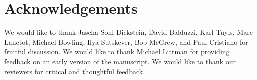 \section*{Acknowledgements}
We would like to thank Jascha Sohl-Dickstein, David Balduzzi, Karl Tuyls, Marc Lanctot, Michael Bowling, Ilya Sutskever, Bob McGrew, and Paul Cristiano for fruitful discussion. We would like to thank Michael Littman for providing feedback on an early version of the manuscript. We would like to thank our reviewers for critical and thoughtful feedback.